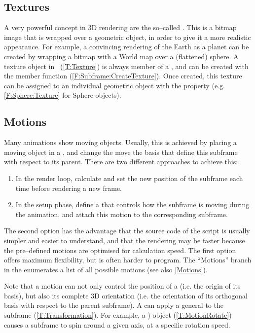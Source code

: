 \subsection{Textures}
A very powerful concept in 3D rendering are the so--called . This is a bitmap image that is wrapped over a geometric object, in order to give it a more realistic appearance. For example, a convincing rendering of the Earth as a planet can be created by wrapping a bitmap with a World map over a (flattened) sphere. A texture object in \softwarename\ (\ref{T:Texture}) is always member of a , and can be created with the member function  (\ref{F:Subframe:CreateTexture}). Once created, this texture can be assigned to an individual geometric object with the property  (e.g. \ref{F:Sphere:Texture} for Sphere objects). 

\subsection{Motions}
Many animations show moving objects. Usually, this is achieved by placing a moving object in a , and change the move the basis that define this subframe with respect to its parent. There are two different approaches to achieve this:
\begin{enumerate}
\item In the render loop, calculate and set the new position of the subframe each time before rendering a new frame.
\item In the setup phase, define a  that controls how the subframe is moving during the animation, and attach this motion to the corresponding subframe.
\end{enumerate}
The second option has the advantage that the source code of the script is usually simpler and easier to understand, and that the rendering may be faster because the pre--defined motions are optimised for calculation speed. The first option offers maximum flexibility, but is often harder to program. The ``Motions'' branch in the \functionspanel enumerates a list of all possible motions (see also \ref{Motions}).

Note that a motion can not only control the position of a  (i.e. the origin of its basis), but also its complete 3D orientation (i.e. the orientation of its orthogonal basis with respect to the parent subframe). A  can apply a general  to the subframe (\ref{T:Transformation}). For example, a ) object (\ref{T:MotionRotate}) causes a subframe to spin around a given axis, at a specific rotation speed.